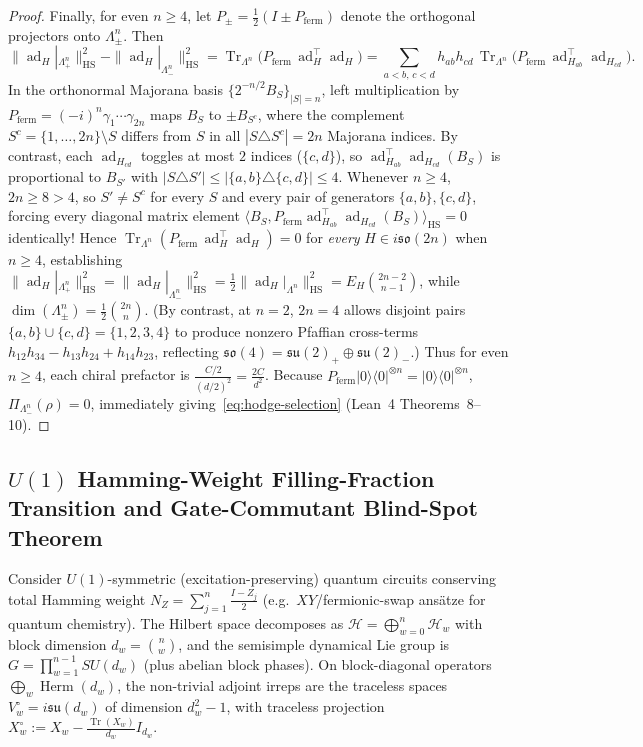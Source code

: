 \documentclass[11pt,a4paper]{article}
\theoremstyle{definition}
\theoremstyle{remark}
\newcommand{\Tr}{\operatorname{Tr}}
\newcommand{\ad}{\operatorname{ad}}
\newcommand{\HS}{\mathrm{HS}}
\newcommand{\Herm}{\operatorname{Herm}}
\newcommand{\so}{\mathfrak{so}}
\newcommand{\su}{\mathfrak{su}}
\begin{document}
\begin{proof}
Finally, for even $n \ge 4$, let $P_\pm = \frac{1}{2}(I \pm P_{\mathrm{ferm}})$ denote the orthogonal projectors onto $\Lambda^n_\pm$. Then
\[
  \|\ad_H|_{\Lambda^n_+}\|_{\HS}^2 - \|\ad_H|_{\Lambda^n_-}\|_{\HS}^2
  = \Tr_{\Lambda^n}\!\bigl(P_{\mathrm{ferm}}\,\ad_H^\top \ad_H\bigr)
  = \sum_{a<b,\, c<d} h_{ab} h_{cd}\,\Tr_{\Lambda^n}\!\bigl(P_{\mathrm{ferm}}\,\ad_{H_{ab}}^\top \ad_{H_{cd}}\bigr).
\]
In the orthonormal Majorana basis $\{2^{-n/2} B_S\}_{|S|=n}$, left multiplication by $P_{\mathrm{ferm}} = (-i)^n \gamma_1\cdots\gamma_{2n}$ maps $B_S$ to $\pm B_{S^c}$, where the complement $S^c = \{1,\dots,2n\}\setminus S$ differs from $S$ in all $|S \triangle S^c| = 2n$ Majorana indices. By contrast, each $\ad_{H_{cd}}$ toggles at most $2$ indices ($\{c,d\}$), so $\ad_{H_{ab}}^\top \ad_{H_{cd}}(B_S)$ is proportional to $B_{S'}$ with $|S \triangle S'| \le |\{a,b\}\triangle\{c,d\}| \le 4$. Whenever $n \ge 4$, $2n \ge 8 > 4$, so $S' \neq S^c$ for every $S$ and every pair of generators $\{a,b\},\{c,d\}$, forcing every diagonal matrix element $\langle B_S, P_{\mathrm{ferm}} \ad_{H_{ab}}^\top \ad_{H_{cd}}(B_S)\rangle_{\HS} = 0$ identically! Hence $\Tr_{\Lambda^n}(P_{\mathrm{ferm}}\,\ad_H^\top\ad_H) = 0$ for \emph{every} $H \in i\so(2n)$ when $n \ge 4$, establishing $\|\ad_H|_{\Lambda^n_+}\|_{\HS}^2 = \|\ad_H|_{\Lambda^n_-}\|_{\HS}^2 = \frac{1}{2}\|\ad_H|_{\Lambda^n}\|_{\HS}^2 = E_H\binom{2n-2}{n-1}$, while $\dim(\Lambda^n_\pm) = \frac{1}{2}\binom{2n}{n}$. (By contrast, at $n = 2$, $2n = 4$ allows disjoint pairs $\{a,b\}\cup\{c,d\}=\{1,2,3,4\}$ to produce nonzero Pfaffian cross-terms $h_{12}h_{34} - h_{13}h_{24} + h_{14}h_{23}$, reflecting $\so(4) = \su(2)_+ \oplus \su(2)_-$.) Thus for even $n \ge 4$, each chiral prefactor is $\frac{C/2}{(d/2)^2} = \frac{2C}{d^2}$. Because $P_{\mathrm{ferm}}|0\rangle\langle 0|^{\otimes n} = |0\rangle\langle 0|^{\otimes n}$, $\Pi_{\Lambda^n_-}(\rho) = 0$, immediately giving~\eqref{eq:hodge-selection} (Lean~4 Theorems~8--10).
\end{proof}

\subsection{\texorpdfstring{$U(1)$}{U(1)} Hamming-Weight Filling-Fraction Transition and Gate-Commutant Blind-Spot Theorem}

Consider $U(1)$-symmetric (excitation-preserving) quantum circuits conserving total Hamming weight $N_Z = \sum_{j=1}^n \frac{I-Z_j}{2}$ (e.g.\ $XY$/fermionic-swap ans\"atze for quantum chemistry). The Hilbert space decomposes as $\mathcal{H} = \bigoplus_{w=0}^n \mathcal{H}_w$ with block dimension $d_w = \binom{n}{w}$, and the semisimple dynamical Lie group is $G = \prod_{w=1}^{n-1} SU(d_w)$ (plus abelian block phases). On block-diagonal operators $\bigoplus_w \Herm(d_w)$, the non-trivial adjoint irreps are the traceless spaces $V_w^\circ = i\su(d_w)$ of dimension $d_w^2 - 1$, with traceless projection $X_w^\circ := X_w - \frac{\Tr(X_w)}{d_w} I_{d_w}$.
\end{document}
